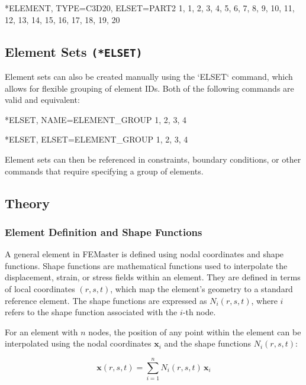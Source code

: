 \begin{codeBlock}
*ELEMENT, TYPE=C3D20, ELSET=PART2
1, 1, 2, 3, 4, 5, 6, 7, 8,
   9, 10, 11, 12, 13, 14, 15, 16,
    17, 18, 19, 20
\end{codeBlock}

\subsection{Element Sets \texttt{(*ELSET)}}

Element sets can also be created manually using the `ELSET` command, which allows for flexible grouping of element IDs.
Both of the following commands are valid and equivalent:

\begin{codeBlock}
*ELSET, NAME=ELEMENT_GROUP
1, 2, 3, 4
\end{codeBlock}

\begin{codeBlock}
*ELSET, ELSET=ELEMENT_GROUP
1, 2, 3, 4
\end{codeBlock}

Element sets can then be referenced in constraints, boundary conditions, or other commands that require specifying a group of elements.

\subsection{Theory}

\subsubsection{Element Definition and Shape Functions}

A general element in FEMaster is defined using nodal coordinates and shape functions. Shape functions are mathematical functions used to interpolate the displacement, strain, or stress fields within an element. They are defined in terms of local coordinates \((r, s, t)\), which map the element's geometry to a standard reference element. The shape functions are expressed as \( N_i(r, s, t) \), where \( i \) refers to the shape function associated with the \(i\)-th node.

For an element with \( n \) nodes, the position of any point within the element can be interpolated using the nodal coordinates \( \mathbf{x}_i \) and the shape functions \( N_i(r, s, t) \):

\[
\mathbf{x}(r, s, t) = \sum_{i=1}^{n} N_i(r, s, t) \, \mathbf{x}_i
\]

